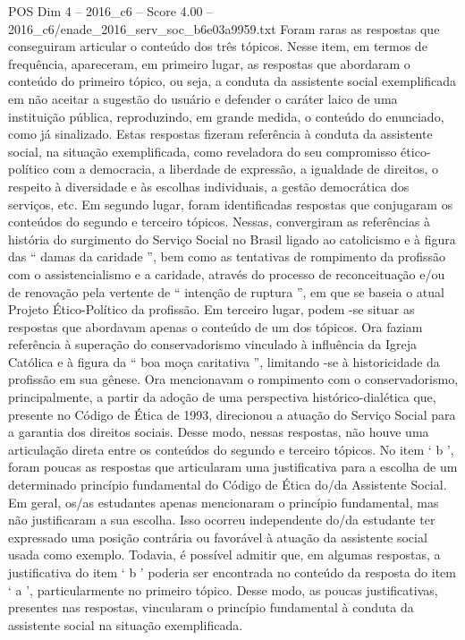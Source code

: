\begin{textsample}{POS Dim 4 – 2016\_c6 – Score 4.00 – 2016\_c6/enade\_2016\_serv\_soc\_b6e03a9959.txt}
Foram raras as respostas que conseguiram articular o conteúdo dos três tópicos.
Nesse item, em termos de frequência, apareceram, em primeiro lugar, as respostas que abordaram o conteúdo do primeiro tópico, ou seja, a conduta da assistente social exemplificada em não aceitar a sugestão do usuário e defender o caráter laico de uma instituição pública, reproduzindo, em grande medida, o conteúdo do enunciado, como já sinalizado.
Estas respostas fizeram referência à conduta da assistente social, na situação exemplificada, como reveladora do seu compromisso ético-político com a democracia, a liberdade de expressão, a igualdade de direitos, o respeito à diversidade e às escolhas individuais, a gestão democrática dos serviços, etc.
Em segundo lugar, foram identificadas respostas que conjugaram os conteúdos do segundo e terceiro tópicos.
Nessas, convergiram as referências à história do surgimento do Serviço Social no Brasil ligado ao catolicismo e à figura das “ damas da caridade ”, bem como as tentativas de rompimento da profissão com o assistencialismo e a caridade, através do processo de reconceituação e/ou de renovação pela vertente de “ intenção de ruptura ”, em que se baseia o atual Projeto Ético-Político da profissão.
Em terceiro lugar, podem -se situar as respostas que abordavam apenas o conteúdo de um dos tópicos.
Ora faziam referência à superação do conservadorismo vinculado à influência da Igreja Católica e à figura da “ boa moça caritativa ”, limitando -se à historicidade da profissão em sua gênese.
Ora mencionavam o rompimento com o conservadorismo, principalmente, a partir da adoção de uma perspectiva histórico-dialética que, presente no Código de Ética de 1993, direcionou a atuação do Serviço Social para a garantia dos direitos sociais.
Desse modo, nessas respostas, não houve uma articulação direta entre os conteúdos do segundo e terceiro tópicos.
No item ‘ b ’, foram poucas as respostas que articularam uma justificativa para a escolha de um determinado princípio fundamental do Código de Ética do/da Assistente Social.
Em geral, os/as estudantes apenas mencionaram o princípio fundamental, mas não justificaram a sua escolha.
Isso ocorreu independente do/da estudante ter expressado uma posição contrária ou favorável à atuação da assistente social usada como exemplo.
Todavia, é possível admitir que, em algumas respostas, a justificativa do item ‘ b ’ poderia ser encontrada no conteúdo da resposta do item ‘ a ’, particularmente no primeiro tópico.
Desse modo, as poucas justificativas, presentes nas respostas, vincularam o princípio fundamental à conduta da assistente social na situação exemplificada.

\end{textsample}
